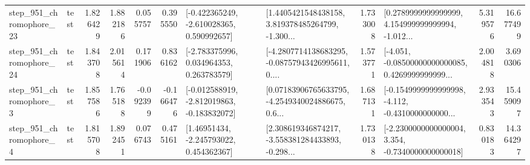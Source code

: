 \begin{tabular}{llrrrrllrlrr}
  step\_951\_chromophore\_23 &      test &      1.826429 &    1.882186 &      0.055757 &  0.395550 &   [-0.422365249, -2.610028365, 0.590992657] &  [1.4405421548438158, 3.819378485264799, -1.300... &       1.733008 &  [0.2789999999999999, 4.154999999999994, -1.012... &            5.319576 &         16.677499 \\
  step\_951\_chromophore\_24 &      test &      1.843708 &    2.015614 &      0.171906 &  0.836162 &    [-2.783375996, 0.034964353, 0.263783579] &  [-4.2807714138683295, -0.08757943426995611, 0.... &       1.573771 &  [-4.051, -0.08500000000000085, 0.4269999999999... &            2.004818 &          3.690306 \\
   step\_951\_chromophore\_3 &      test &      1.857586 &    1.765188 &     -0.092399 & -0.166476 &  [-0.012588919, -2.812019863, -0.183832072] &  [0.07183906765633795, -4.2549340024886675, 0.6... &       1.687131 &  [-0.1549999999999998, -4.112, -0.4310000000000... &            2.933543 &         15.459097 \\
   step\_951\_chromophore\_4 &      test &      1.815708 &    1.892451 &      0.076743 &  0.475161 &     [1.46951434, -2.245793022, 0.454362367] &  [2.308619346874217, -3.558381284433893, -0.298... &       1.730138 &  [-2.2300000000000004, 3.354, -0.7340000000000018] &            0.830183 &         14.364297 \\
\bottomrule
\end{tabular}

